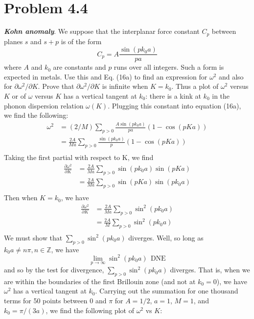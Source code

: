 \documentclass{article}
\begin{document}
\section*{Problem 4.4}
\textit{\textbf{Kohn anomaly}}. We suppose that the interplanar force constant $C_p$ between planes $s$ and $s + p$ is of the form
\[C_p = A\frac{\sin{(pk_0a)}}{pa}\]
where $A$ and $k_0$ are constants and $p$ runs over all integers. Such a form is expected in metals. Use this and Eq. (16a) to find an expression for $\omega^2$ and also for $\partial \omega^2/\partial K$. Prove that $\partial \omega^2/\partial K$ is infinite when $K = k_0$. Thus a plot of $\omega^2$ versus $K$ or of $\omega$ versus $K$ has a vertical tangent at $k_0$: there is a kink at $k_0$ in the phonon dispersion relation $\omega(K)$.
\newline\newline
Plugging this constant into equation (16a), we find the following:
\begin{align*}
    \omega^2 &= (2/M)\sum_{p > 0}\frac{A\sin{(pk_0a)}}{pa}(1 - \cos{(pKa)}) \\
    &= \frac{2A}{Ma}\sum_{p > 0}\frac{\sin{(pk_0a)}}{p}(1 - \cos{(pKa)}) \\
\end{align*}
Taking the first partial with respect to K, we find
\begin{align*}
    \frac{\partial\omega^2}{\partial K} &= \frac{2A}{Ma}\sum_{p > 0}\sin{(pk_0a)}\sin{(pKa)}\\
    &= \frac{2A}{Ma}\sum_{p > 0}\sin{(pKa)}\sin{(pk_0a)} \\
\end{align*}
Then when $K = k_0$, we have
\begin{align*}
    \frac{\partial\omega^2}{\partial K} &= \frac{2A}{Ma}\sum_{p > 0}\sin^2{(pk_0a)} \\
    &= \frac{2A}{M}\sum_{p > 0} \sin^2{(pk_0a)} \\
\end{align*}
We must show that $\sum_{p > 0}\sin^2{(pk_0a)}$ diverges. Well, so long as $k_0a \neq n\pi, n \in \mathbb{Z}$, we have 
\[\lim_{p \to \infty} \sin^2{(pk_0a)} \:\: \text{DNE}\]
and so by the test for divergence, $\sum_{p > 0} \sin^2{(pk_0a)}$ diverges. That is, when we are within the boundaries of the first Brillouin zone (and not at $k_0 = 0$), we have $\omega^2$ has a vertical tangent at $k_0$.
\newline\newline\newline
Carrying out the summation for one thousand terms for 50 points between $0$ and $\pi$ for $A = 1/2$, $a = 1$, $M = 1$, and $k_0 = \pi/(3a)$, we find the following plot of $\omega^2$ vs $K$:
\end{document}

